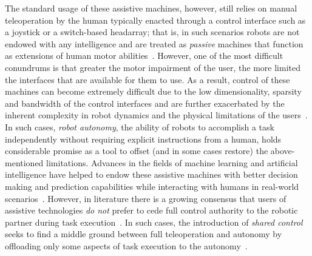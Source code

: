 \documentclass[12pt]{article}
\begin{document}
%
%
The standard usage of these assistive machines, however, still relies on manual teleoperation by the human typically enacted through a control interface such as a joystick or a switch-based headarray; that is, in such scenarios robots are not endowed with any intelligence and are treated as \textit{passive} machines that function as extensions of human motor abilities~\cite{simpson2008tooth}. However, one of the most difficult conundrums is that greater the motor impairment of the user, the more limited the interfaces that are available for them to use. As a result, control of these machines can become extremely difficult due to the low dimensionality, sparsity and bandwidth of the control interfaces and are further exacerbated by the inherent complexity in robot dynamics and the physical limitations of the users~\cite{pilarski2012dynamic}.
In such cases, \textit{robot autonomy}, the ability of robots to accomplish a task independently without requiring explicit instructions from a human, holds considerable promise as a tool to offset (and in some cases restore) the above-mentioned limitations. Advances in the fields of machine learning and artificial intelligence have helped to endow these assistive machines with better decision making and prediction capabilities while interacting with humans in real-world scenarios~\cite{huang2015using}.
However, in literature there is a growing consensus that users of assistive technologies \textit{do not} prefer to cede full control authority to the robotic partner during task execution~\cite{gopinath2017human}. In such cases, the introduction of \textit{shared control} seeks to find a middle ground between full teleoperation and autonomy by offloading only some aspects of task execution to the autonomy~\cite{wasson2003user, demeester2008user}. 
\end{document}
